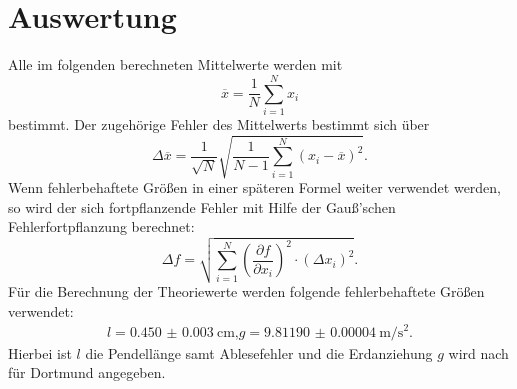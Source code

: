 \section{Auswertung}
\label{sec:Auswertung}
Alle im folgenden berechneten Mittelwerte werden mit
\begin{equation}
	\label{eqn:mittelwert}
	\overline x=\frac{1}{N}\sum \limits_{i=1}^{N} x_i
\end{equation}
bestimmt.
Der zugehörige Fehler des Mittelwerts bestimmt sich über
\begin{equation}
	\label{eqn:mittelwertfehler}
	\Delta \overline x= \frac{1}{\sqrt{N}} \sqrt{\frac{1}{N-1} \sum \limits_{i=1}^{N} (x_i- \overline x)^2}\text{.}
\end{equation}
Wenn fehlerbehaftete Größen in einer späteren Formel weiter verwendet werden, so wird der sich fortpflanzende Fehler
mit Hilfe der Gauß’schen Fehlerfortpflanzung berechnet:
\begin{equation}
	\label{eqn:fehlerfortpflanzung}
	\Delta f = \sqrt{ \sum \limits_{i = 1}^{N} (\frac{\partial f}{\partial x_i})^2 \cdot (\Delta x_i)^2}\text{.}
\end{equation}
\FloatBarrier
Für die Berechnung der Theoriewerte werden folgende fehlerbehaftete Größen verwendet:
\begin{gather*}
	l=\SI{0.450(3)}{\centi\meter} \text{,}
	g=\SI{9.81190(4)}{\meter\per\square\second} \text{.}
\end{gather*}
Hierbei ist $l$ die Pendellänge samt Ablesefehler und die Erdanziehung $g$ wird nach \cite{G} für Dortmund angegeben.
